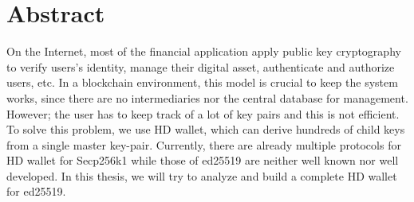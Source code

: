 \chapter*{Abstract}
\thispagestyle{fancy}
\label{preface}
\hspace*{5cm}

On the Internet, most of the financial application apply public key cryptography to verify users's identity, manage their digital asset, authenticate and authorize users, etc. In a blockchain environment, this model is crucial to keep the system works, since there are no intermediaries nor the central database for management. However; the user has to keep track of a lot of key pairs and this is not efficient.
To solve this problem, we use HD wallet, which can derive hundreds of child keys from a single master key-pair. Currently, there are already multiple protocols for HD wallet for Secp256k1 while those of ed25519 are neither well known nor well developed. In this thesis, we will try to analyze and build a complete HD wallet for ed25519.

\cleardoublepage